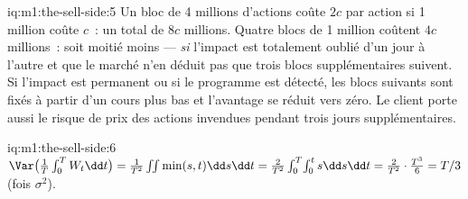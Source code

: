 \begin{solution}{iq:m1:the-sell-side:5}
Un bloc de 4 millions d'actions coûte $2c$ par action si 1 million coûte $c$~: un total
de $8c$ millions. Quatre blocs de 1 million coûtent $4c$ millions~: soit moitié moins
--- \emph{si} l'impact est totalement oublié d'un jour à l'autre et que le
marché n'en déduit pas que trois blocs supplémentaires suivent. Si l'impact est permanent
ou si le programme est détecté, les blocs suivants sont fixés à partir d'un cours
plus bas et l'avantage se réduit vers zéro. Le client porte aussi le risque de prix
des actions invendues pendant trois jours supplémentaires.
\end{solution}

\begin{solution}{iq:m1:the-sell-side:6}
$\Var\bigl(\tfrac1T\int_0^T W_t\dd t\bigr) = \tfrac{1}{T^2}\iint
\min(s,t)\dd s\dd t = \tfrac{2}{T^2}\int_0^T\!\int_0^t s\dd s\dd t =
\tfrac{2}{T^2}\cdot\tfrac{T^3}{6} = T/3$ (fois $\sigma^2$).
\end{solution}

